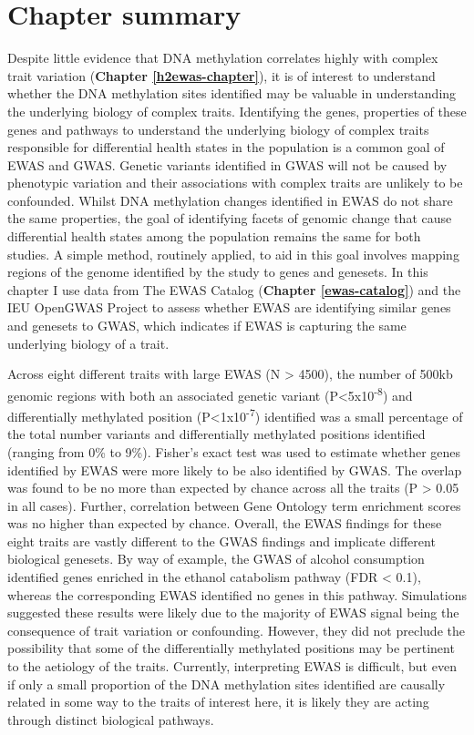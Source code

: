 \documentclass[11pt,twoside]{bristolthesis}
\begin{document}
\hypertarget{chapter-summary-06}{%
\section{Chapter summary}\label{chapter-summary-06}}

Despite little evidence that DNA methylation correlates highly with complex trait variation (\textbf{Chapter \ref{h2ewas-chapter}}), it is of interest to understand whether the DNA methylation sites identified may be valuable in understanding the underlying biology of complex traits. Identifying the genes, properties of these genes and pathways to understand the underlying biology of complex traits responsible for differential health states in the population is a common goal of EWAS and GWAS. Genetic variants identified in GWAS will not be caused by phenotypic variation and their associations with complex traits are unlikely to be confounded. Whilst DNA methylation changes identified in EWAS do not share the same properties, the goal of identifying facets of genomic change that cause differential health states among the population remains the same for both studies. A simple method, routinely applied, to aid in this goal involves mapping regions of the genome identified by the study to genes and genesets. In this chapter I use data from The EWAS Catalog (\textbf{Chapter \ref{ewas-catalog}}) and the IEU OpenGWAS Project to assess whether EWAS are identifying similar genes and genesets to GWAS, which indicates if EWAS is capturing the same underlying biology of a trait.

Across eight different traits with large EWAS (N \textgreater{} 4500), the number of 500kb genomic regions with both an associated genetic variant (P\textless5x10\textsuperscript{-8}) and differentially methylated position (P\textless1x10\textsuperscript{-7}) identified was a small percentage of the total number variants and differentially methylated positions identified (ranging from 0\% to 9\%). Fisher's exact test was used to estimate whether genes identified by EWAS were more likely to be also identified by GWAS. The overlap was found to be no more than expected by chance across all the traits (P \textgreater{} 0.05 in all cases). Further, correlation between Gene Ontology term enrichment scores was no higher than expected by chance. Overall, the EWAS findings for these eight traits are vastly different to the GWAS findings and implicate different biological genesets. By way of example, the GWAS of alcohol consumption identified genes enriched in the ethanol catabolism pathway (FDR \textless{} 0.1), whereas the corresponding EWAS identified no genes in this pathway. Simulations suggested these results were likely due to the majority of EWAS signal being the consequence of trait variation or confounding. However, they did not preclude the possibility that some of the differentially methylated positions may be pertinent to the aetiology of the traits. Currently, interpreting EWAS is difficult, but even if only a small proportion of the DNA methylation sites identified are causally related in some way to the traits of interest here, it is likely they are acting through distinct biological pathways.
\end{document}
